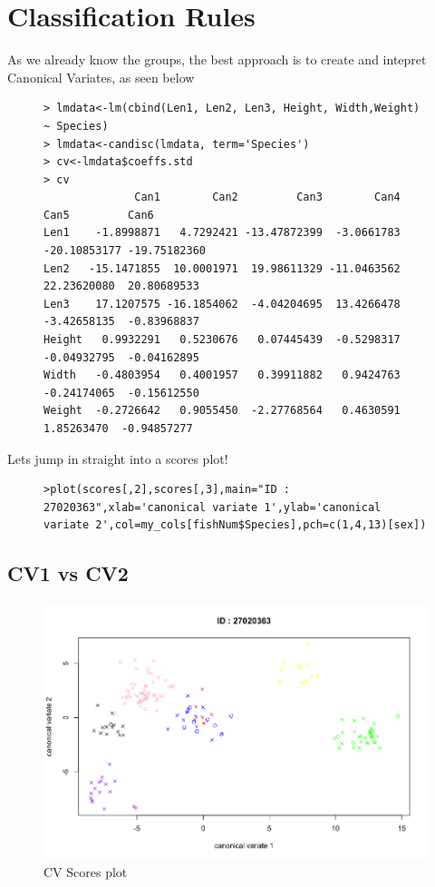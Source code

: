 \documentclass[openany]{article}
\begin{document}
	\section{Classification Rules}
		As we already know the groups, the best approach is to create and intepret Canonical Variates, as seen below
		\begin{figure}[H]
			\iftrue
			\begin{lstlisting}[style=myScalastyle]
> lmdata<-lm(cbind(Len1, Len2, Len3, Height, Width,Weight) ~ Species)
> lmdata<-candisc(lmdata, term='Species')
> cv<-lmdata$coeffs.std
> cv
              Can1        Can2         Can3        Can4         Can5         Can6
Len1    -1.8998871   4.7292421 -13.47872399  -3.0661783 -20.10853177 -19.75182360
Len2   -15.1471855  10.0001971  19.98611329 -11.0463562  22.23620080  20.80689533
Len3    17.1207575 -16.1854062  -4.04204695  13.4266478  -3.42658135  -0.83968837
Height   0.9932291   0.5230676   0.07445439  -0.5298317  -0.04932795  -0.04162895
Width   -0.4803954   0.4001957   0.39911882   0.9424763  -0.24174065  -0.15612550
Weight  -0.2726642   0.9055450  -2.27768564   0.4630591   1.85263470  -0.94857277
			\end{lstlisting}
			\fi
		\end{figure}
		Lets jump in straight into a scores plot!
		\begin{figure}[H]
			\iftrue
			\begin{lstlisting}[style=myScalastyle]
>plot(scores[,2],scores[,3],main="ID : 27020363",xlab='canonical variate 1',ylab='canonical variate 2',col=my_cols[fishNum$Species],pch=c(1,4,13)[sex])
			\end{lstlisting}
			\fi
		\end{figure}
		\subsection{CV1 vs CV2}
			\begin{figure}[H]
				\iftrue
				\caption{CV Scores plot}
				\centering
				\includegraphics[scale=0.2]{res/cv}
				\fi
			\end{figure}
\end{document}
